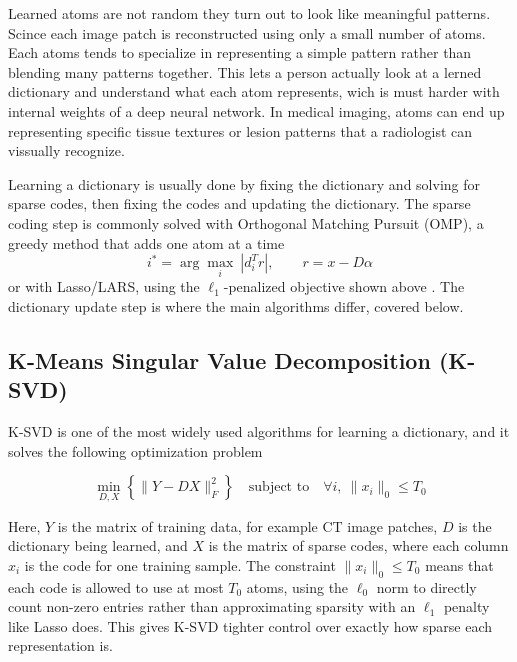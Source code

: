 Learned atoms are not random they turn out to look like meaningful patterns. Scince each image patch is reconstructed using only a small number of atoms.
Each atoms tends to specialize in representing a simple pattern rather than blending many patterns together. This lets a person actually look at a lerned
dictionary and understand what each atom represents, wich is must harder with internal weights of a deep neural network. In medical imaging,
atoms can end up representing specific tissue textures or lesion patterns that a radiologist can vissually recognize\cite{5456190}.


Learning a dictionary is usually done by fixing the dictionary and solving for sparse codes, then fixing the codes and updating the dictionary.
The sparse coding step is commonly solved with Orthogonal Matching Pursuit (OMP), a greedy method that adds one atom at a time \cite{342465}
\begin{equation}[OMP Atom Selection]
i^* = \arg\max_i \ |d_i^T r|, \qquad r = x - D\alpha
\end{equation}
or with Lasso/LARS, using the $\ell_1$-penalized objective shown above \cite{1710377}. The dictionary update step is where the main algorithms differ, covered below.


\subsection{K-Means Singular Value Decomposition (K-SVD)}
\label{sec:lit-ksvd}


K-SVD is one of the most widely used algorithms for learning a dictionary, and it solves the following optimization problem\cite{1710377}

\begin{equation}[K-SVD Optimization Problem]
\min_{D, X} \left\{ \|Y - DX\|_F^2 \right\} \quad \text{subject to} \quad \forall i, \ \|x_i\|_0 \leq T_0
\end{equation}

Here, $Y$ is the matrix of training data, for example CT image patches, $D$ is the dictionary being learned, and $X$ is the matrix of sparse codes,
where each column $x_i$ is the code for one training sample. The constraint $\|x_i\|_0 \leq T_0$ means that each code is allowed to use at most $T_0$ atoms,
using the $\ell_0$ norm to directly count non-zero entries rather than approximating sparsity with an $\ell_1$ penalty like Lasso does. This gives K-SVD
tighter control over exactly how sparse each representation is.

